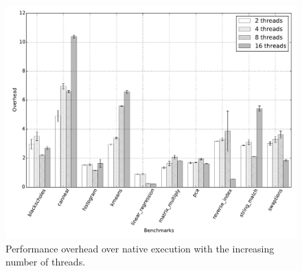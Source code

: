 
\begin{figure}[t]
\centering
\includegraphics[scale=0.35]{figure/benchmarks/times-inspector.pdf}
\caption{Performance overhead over native execution with the increasing number of threads.
}\label{fig:overheads}
\end{figure}
